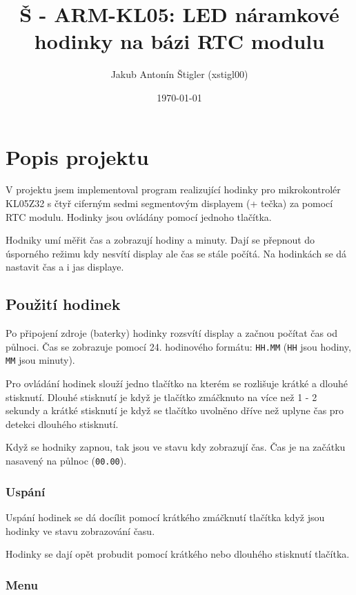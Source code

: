 \documentclass{article}
\title{Š - ARM-KL05: LED náramkové hodinky na bázi RTC modulu}
\author{Jakub Antonín Štigler (xstigl00)}
\date{\today}
\begin{document}
\maketitle

\newpage

\tableofcontents

\newpage

\section{Popis projektu}
V projektu jsem implementoval program realizující hodinky pro mikrokontrolér
KL05Z32 s čtyř ciferným sedmi segmentovým displayem (+ tečka) za pomocí RTC
modulu. Hodinky jsou ovládány pomocí jednoho tlačítka.

Hodniky umí měřit čas a zobrazují hodiny a minuty. Dají se přepnout do
úsporného režimu kdy nesvítí display ale čas se stále počítá. Na hodinkách se
dá nastavit čas a i jas displaye.

\subsection{Použití hodinek}
Po připojení zdroje (baterky) hodinky rozsvítí display a začnou počítat čas od
půlnoci. Čas se zobrazuje pomocí 24. hodinového formátu: \verb|HH.MM|
(\verb|HH| jsou hodiny, \verb|MM| jsou minuty).

Pro ovládání hodinek slouží jedno tlačítko na kterém se rozlišuje krátké a
dlouhé stisknutí. Dlouhé stisknutí je když je tlačítko zmáčknuto na více než
1 - 2 sekundy a krátké stisknutí je když se tlačítko uvolněno dříve než uplyne
čas pro detekci dlouhého stisknutí.

Když se hodniky zapnou, tak jsou ve stavu kdy zobrazují čas. Čas je na začátku
nasavený na půlnoc (\verb|00.00|).

\subsubsection{Uspání}

Uspání hodinek se dá docílit pomocí krátkého zmáčknutí tlačítka když jsou
hodinky ve stavu zobrazování času.

Hodinky se dají opět probudit pomocí krátkého nebo dlouhého stisknutí tlačítka.

\subsubsection{Menu}
\end{document}
